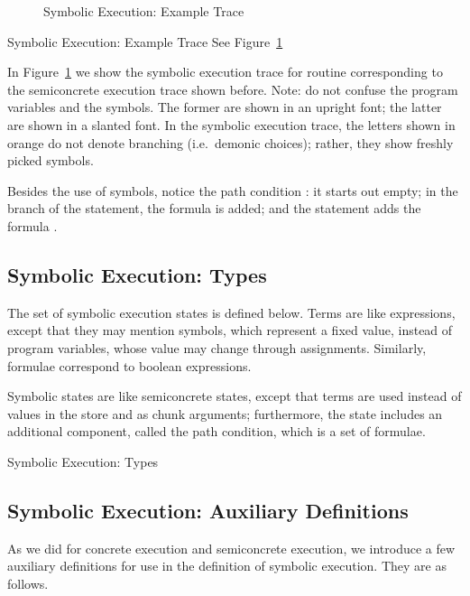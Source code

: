 \documentclass{CSML}
\theoremstyle{definition}\newtheorem{notation}[thm]{Notation}
\theoremstyle{plain}\newtheorem{satz}[thm]{Satz}
\begin{document}
\begin{figure}

\caption{Symbolic Execution: Example Trace}\label{fig:symexec-trace}
\end{figure}

\begin{exa}{Symbolic Execution: Example Trace}
See Figure~\ref{fig:symexec-trace}
\end{exa}

In Figure~\ref{fig:symexec-trace} we show the symbolic execution trace for routine 
 corresponding to the semiconcrete execution 
trace shown before. Note: do not confuse the program variables 
and the symbols. The former are shown in an upright font; the 
latter are shown in a slanted font. In the symbolic execution 
trace, the letters shown in orange do not denote branching 
(i.e.~demonic choices); rather, they show freshly picked 
symbols.

Besides the use of symbols, notice the path condition : 
it starts out empty; in the  branch of the 
 statement, the formula  is added; and the 
 statement adds the formula . 

\subsection{Symbolic Execution: Types}

The set  of symbolic execution states is defined below. Terms are like expressions, except that they may mention symbols, which represent a fixed value,
instead of program variables, whose value may change through assignments. Similarly, formulae correspond to boolean expressions.

Symbolic states are like semiconcrete states, except that terms are used instead of values in the store and as chunk arguments; furthermore, the state includes an
additional component, called the path condition, which is a set of formulae.

\begin{defi}{Symbolic Execution: Types}

\end{defi}

\subsection{Symbolic Execution: Auxiliary Definitions}

As we did for concrete execution and semiconcrete execution, we introduce 
a few auxiliary definitions for use in the definition of symbolic 
execution. They are as follows. 
\end{document}
